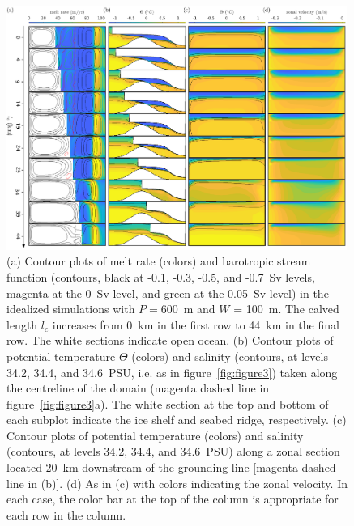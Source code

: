 \documentclass[draft]{agujournal2019}
\begin{document}
\begin{figure}
    \centering
    \includegraphics[width = 0.99\textwidth]{../make_figures/plots/figure5.pdf}
    \caption{(a) Contour plots of melt rate (colors) and barotropic stream function (contours, black at -0.1, -0.3, -0.5, and -0.7~Sv levels, magenta at the 0~Sv level, and green at the 0.05~Sv level) in the idealized simulations with $P = 600$~m and $W$ = 100~m. The calved length $l_c$ increases from 0~km in the first row to 44~km in the final row. The white sections indicate open ocean. (b) Contour plots of potential temperature $\Theta$ (colors) and salinity (contours, at levels 34.2, 34.4, and 34.6~PSU, i.e. as in figure~\ref{fig:figure3}) taken along the centreline of the domain (magenta dashed line in figure~\ref{fig:figure3}a). The white section at the top and bottom of each subplot indicate the ice shelf and seabed ridge, respectively. (c) Contour plots of potential temperature (colors) and salinity (contours, at levels 34.2, 34.4, and 34.6~PSU) along a zonal section located 20~km downstream of the grounding line [magenta dashed line in (b)]. (d) As in (c) with colors indicating the zonal velocity.  In each case, the color bar at the top of the column is appropriate for each row in the column. }
    \label{fig:figure5}
\end{figure}
\end{document}

